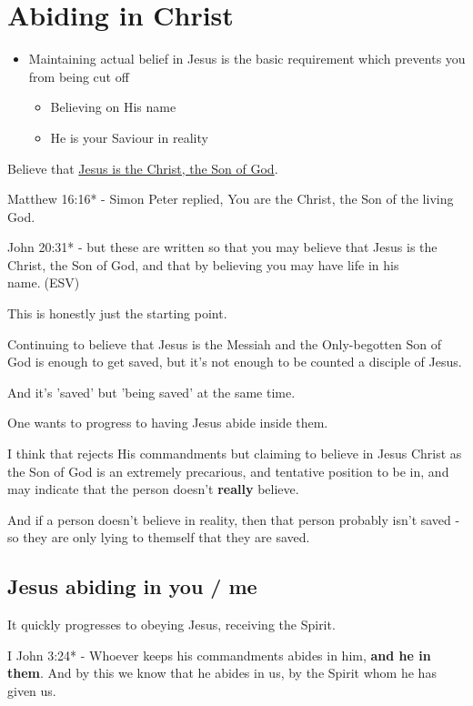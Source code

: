 \documentclass[11pt]{article}
\begin{document}
\section{Abiding in Christ}
\label{sec:org0f78779}
\begin{itemize}
\item Maintaining actual belief in Jesus is the basic requirement which prevents you from being cut off
\begin{itemize}
\item Believing on His name
\item He is your Saviour in reality
\end{itemize}
\end{itemize}

Believe that \uline{Jesus is the Christ, the Son of God}.

Matthew 16:16* - Simon Peter replied, You are the Christ, the Son of the living God.

John 20:31* - but these are written so that you may believe that Jesus is the Christ, the Son of God, and that by believing you may have life in his name.􀀁(ESV)

This is honestly just the starting point.

Continuing to believe that Jesus is the Messiah and the Only-begotten Son of God is enough to get saved, but it's not enough to be counted a disciple of Jesus.

And it's 'saved' but 'being saved' at the same time.

One wants to progress to having Jesus abide inside them.

I think that rejects His commandments but claiming to believe in Jesus Christ as the Son of God is an extremely precarious, and tentative position to be in,
and may indicate that the person doesn't \textbf{really} believe.

And if a person doesn't believe in reality, then that person probably isn't saved - so they are only lying to themself that they are saved.

\subsection{Jesus abiding in \textbf{you} / \textbf{me}}
\label{sec:org385975c}
It quickly progresses to obeying Jesus, receiving the Spirit.

I John 3:24* - Whoever keeps his commandments abides in him, \textbf{and he in them}. And by this we know that he abides in us, by the Spirit whom he has given us.
\end{document}
